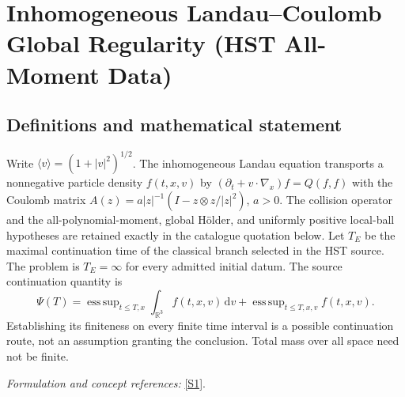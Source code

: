 \documentclass[11pt,a4paper]{article}
\newcommand{\R}{\mathbb{R}}
\newcommand{\dd}{\,\mathrm d}
\newcommand{\sref}[2]{\hyperlink{source:#1:#2}{[S#2]}}
\numberwithin{equation}{section}
\begin{document}
\setcounter{section}{0}
\clearpage
\section*{\texorpdfstring{Inhomogeneous Landau–Coulomb Global Regularity (HST All-Moment Data)}{Inhomogeneous Landau–Coulomb Global Regularity (HST All-Moment Data)}}\label{statement}
\subsection{Definitions and mathematical statement}
Write $\langle v\rangle=(1+|v|^2)^{1/2}$. The inhomogeneous Landau equation transports a nonnegative particle density $f(t,x,v)$ by
$(\partial_t+v\cdot\nabla_x)f=Q(f,f)$ with the Coulomb matrix
$A(z)=a|z|^{-1}(I-z\otimes z/|z|^2)$, $a>0$. The collision operator and the all-polynomial-moment, global H\"older, and uniformly positive local-ball hypotheses are retained exactly in the catalogue quotation below. Let $T_E$ be the maximal continuation time of the classical branch selected in the HST source. The problem is $T_E=\infty$ for every admitted initial datum. The source continuation quantity is
\[
 \Psi(T)=\mathop{\mathrm{ess\,sup}}_{t\le T,x}\int_{\R^3}f(t,x,v)\dd v
 +\mathop{\mathrm{ess\,sup}}_{t\le T,x,v}f(t,x,v).
\]
Establishing its finiteness on every finite time interval is a possible continuation route, not an assumption granting the conclusion. Total mass over all space need not be finite.
\par\smallskip\textit{Formulation and concept references:} \sref{statement}{1}.
\end{document}
